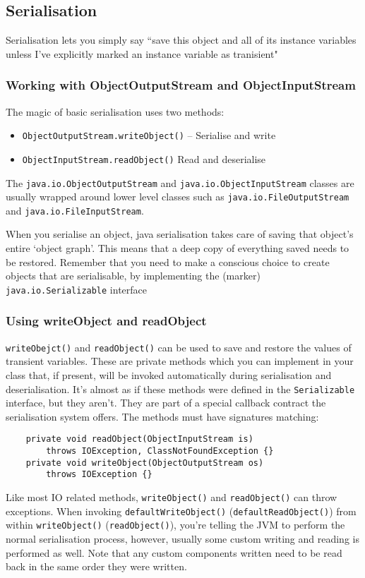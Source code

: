 \subsection{Serialisation}
Serialisation lets you simply say ``save this object and all of its instance 
variables unless I've explicitly marked an instance variable as tranisient"

\subsubsection{Working with ObjectOutputStream and ObjectInputStream}
The magic of basic serialisation uses two methods:
\begin{itemize}
    \item \verb#ObjectOutputStream.writeObject()# -- Serialise and write
    \item \verb#ObjectInputStream.readObject()# Read and deserialise
\end{itemize}
The \verb#java.io.ObjectOutputStream# and \verb#java.io.ObjectInputStream# 
classes are usually wrapped around lower level classes such as 
\verb#java.io.FileOutputStream# and \verb#java.io.FileInputStream#.

When you serialise an object, java serialisation takes care of saving that 
object's entire `object graph'. This means that a deep copy of everything 
saved needs to be restored. Remember that you need to make a conscious choice 
to create objects that are serialisable, by implementing the (marker) 
\verb#java.io.Serializable# interface

\subsubsection{Using writeObject and readObject}
\verb#writeObejct()# and \verb#readObject()# can be used to save and restore 
the values of transient variables. These are private methods which you can 
implement in your class that, if present, will be invoked automatically during 
serialisation and deserialisation. It's almost as if these methods were defined 
in the \verb#Serializable# interface, but they aren't. They are part of a 
special callback contract the serialisation system offers. The methods must 
have signatures matching:
\begin{verbatim}
    private void readObject(ObjectInputStream is)
        throws IOException, ClassNotFoundException {}
    private void writeObject(ObjectOutputStream os)
        throws IOException {}
\end{verbatim}
Like most IO related methods, \verb#writeObject()# and \verb#readObject()# can 
throw exceptions. When invoking \verb#defaultWriteObject()# 
(\verb#defaultReadObject()#) from within \verb#writeObject()# 
(\verb#readObject()#), you're telling the JVM to perform the normal 
serialisation process, however, usually some custom writing and reading is 
performed as well. Note that any custom components written need to be read back 
in the same order they were written.


